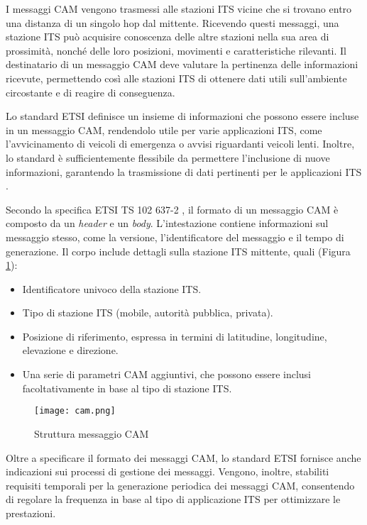 I messaggi CAM vengono trasmessi alle stazioni ITS vicine che si trovano entro una distanza di un singolo hop dal mittente. Ricevendo questi messaggi, una stazione ITS può acquisire conoscenza delle altre stazioni nella sua area di prossimità, nonché delle loro posizioni, movimenti e caratteristiche rilevanti. Il destinatario di un messaggio CAM deve valutare la pertinenza delle informazioni ricevute, permettendo così alle stazioni ITS di ottenere dati utili sull'ambiente circostante e di reagire di conseguenza.

Lo standard ETSI definisce un insieme di informazioni che possono essere incluse in un messaggio CAM, rendendolo utile per varie applicazioni ITS, come l'avvicinamento di veicoli di emergenza o avvisi riguardanti veicoli lenti. Inoltre, lo standard è sufficientemente flessibile da permettere l'inclusione di nuove informazioni, garantendo la trasmissione di dati pertinenti per le applicazioni ITS \cite{cam_denm}.

Secondo la specifica ETSI TS 102 637-2 \cite{etsi2010102}, il formato di un messaggio CAM è composto da un \textit{header} e un \textit{body}. L'intestazione contiene informazioni sul messaggio stesso, come la versione, l'identificatore del messaggio e il tempo di generazione. Il corpo include dettagli sulla stazione ITS mittente, quali (Figura \ref{fig:cam}):

\begin{itemize}
    \item Identificatore univoco della stazione ITS.
    \item Tipo di stazione ITS (mobile, autorità pubblica, privata).
    \item Posizione di riferimento, espressa in termini di latitudine, longitudine, elevazione e direzione.
    \item Una serie di parametri CAM aggiuntivi, che possono essere inclusi facoltativamente in base al tipo di stazione ITS.
\end{itemize}

\begin{figure}[h!]
    \centering
    \texttt{[image: cam.png]}
    \caption{Struttura messaggio CAM}
    \label{fig:cam}
\end{figure}

Oltre a specificare il formato dei messaggi CAM, lo standard ETSI fornisce anche indicazioni sui processi di gestione dei messaggi. Vengono, inoltre, stabiliti requisiti temporali per la generazione periodica dei messaggi CAM, consentendo di regolare la frequenza in base al tipo di applicazione ITS per ottimizzare le prestazioni.

